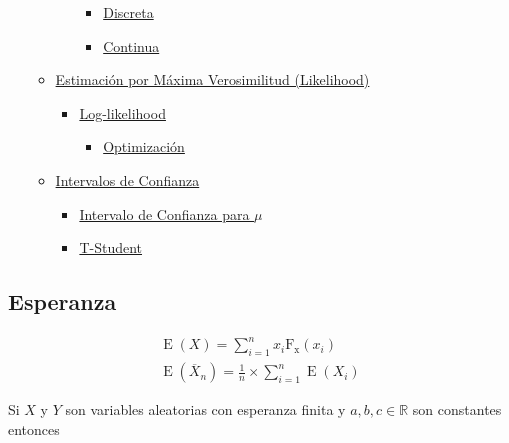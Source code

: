\documentclass[
]{article}
\providecommand{\tightlist}{%
  \setlength{\itemsep}{0pt}\setlength{\parskip}{0pt}}
\begin{document}
\begin{itemize}
\begin{itemize}
\begin{itemize}
      \begin{itemize}
      \tightlist
      \item
        \protect\hyperlink{discreta}{Discreta}
      \item
        \protect\hyperlink{continua}{Continua}
      \end{itemize}
    \end{itemize}
  \item
    \protect\hyperlink{estimaciuxf3n-por-muxe1xima-verosimilitud-likelihood}{Estimación
    por Máxima Verosimilitud (Likelihood)}

    \begin{itemize}
    \tightlist
    \item
      \protect\hyperlink{log-likelihood}{Log-likelihood}

      \begin{itemize}
      \tightlist
      \item
        \protect\hyperlink{optimizaciuxf3n}{Optimización}
      \end{itemize}
    \end{itemize}
  \item
    \protect\hyperlink{intervalos-de-confianza}{Intervalos de Confianza}

    \begin{itemize}
    \tightlist
    \item
      \protect\hyperlink{intervalo-de-confianza-para-mu}{Intervalo de
      Confianza para \(\mu\)}
    \item
      \protect\hyperlink{t-student}{T-Student}
    \end{itemize}
  \end{itemize}
\end{itemize}

\hypertarget{esperanza}{%
\subsection{Esperanza}\label{esperanza}}

\[
\begin{align*}
    {\operatorname{E}(X)=\sum_{i=1}^{n}x_{i}\operatorname{F_x}(x_i)} \\
    \operatorname{E}(\overline{X}_n)= \frac{1}{n}\times\sum_{i=1}^{n}{\operatorname {E}(X_i)}
\end{align*}
\]

Si \(X\) y \(Y\) son variables aleatorias con esperanza finita y
\({a,b,c \in \mathbb {R} }\) son constantes entonces
\end{document}
